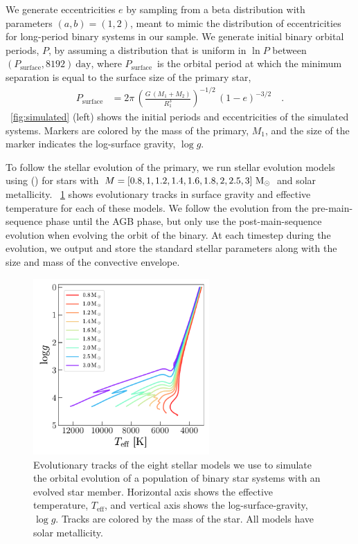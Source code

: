 \documentclass[modern, letterpaper]{aastex62}
\newcommand{\logg}{\ensuremath{\log g}}
\newcommand{\Psurf}{\ensuremath{P_\textrm{surface}}}
\begin{document}
We generate eccentricities $e$ by sampling from a beta distribution with
parameters $(a, b) = (1, 2)$, meant to mimic the distribution of eccentricities
for long-period binary systems in our sample.
We generate initial binary orbital periods, $P$, by assuming a distribution that
is uniform in $\ln P$ between $(\Psurf, 8192)~\textrm{day}$, where
\Psurf\ is the orbital period at which the minimum separation is
equal to the surface size of the primary star,
\begin{align}
    \Psurf &= 2\pi \,
        \left(\frac{G \, (M_1+M_2)}{R_1^3}\right)^{-1/2} \,
        \left(1-e\right)^{-3/2}
    \quad . \label{eq:Psurf}
\end{align}
\figurename~\ref{fig:simulated} (left) shows the initial periods and
eccentricities of the simulated systems.
Markers are colored by the mass of the primary, $M_1$, and the size of the
marker indicates the log-surface gravity, \logg.

To follow the stellar evolution of the primary, we run stellar evolution models
using  (\citealt{Paxton:2011}) for stars with $M = [0.8, 1, 1.2,
1.4, 1.6, 1.8, 2, 2.5, 3]~\mathrm{M}_\odot$ and solar metallicity.
\figurename~\ref{fig:mesa} shows evolutionary tracks in surface gravity and
effective temperature for each of these models.
We follow the evolution from the pre-main-sequence phase until the AGB phase,
but only use the post-main-sequence evolution when evolving the orbit of the
binary.
At each timestep during the evolution, we output and store the standard stellar
parameters along with the size and mass of the convective envelope.

\begin{figure}[h]
\begin{center}
\includegraphics[width=0.6\textwidth]{mesa}
\end{center}
\caption{%
Evolutionary tracks of the eight stellar models we use to simulate the orbital
evolution of a population of binary star systems with an evolved star member.
Horizontal axis shows the effective temperature, $T_\textrm{eff}$, and vertical
axis shows the log-surface-gravity, \logg.
Tracks are colored by the mass of the star.
All models have solar metallicity.
\label{fig:mesa}
}
\end{figure}
\end{document}
